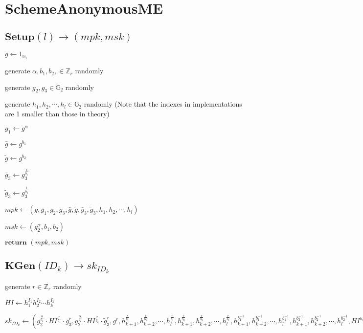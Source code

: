 \documentclass[a4paper]{article}
\begin{document}
\section{SchemeAnonymousME}

\subsection{$\textbf{Setup}(l) \rightarrow (\textit{mpk}, \textit{msk})$}

$g \gets 1_{\mathbb{G}_1}$

generate $\alpha, b_1, b_2, \in \mathbb{Z}_r$ randomly

generate $g_2, g_3 \in \mathbb{G}_2$ randomly

generate $h_1, h_2, \cdots, h_l \in \mathbb{G}_2$ randomly (Note that the indexes in implementations are 1 smaller than those in theory)

$g_1 \gets g^\alpha$

$\bar{g} \gets g^{b_1}$

$\tilde{g} \gets g^{b_2}$

$\bar{g}_3 \gets g_3^{\frac{1}{b_1}}$

$\tilde{g}_3 \gets g_3^{\frac{1}{b_2}}$

$\textit{mpk} \gets (g, g_1, g_2, g_3, \bar{g}, \tilde{g}, \bar{g}_3, \tilde{g}_3, h_1, h_2, \cdots, h_l)$

$\textit{msk} \gets (g_2^\alpha, b_1, b_2)$

$\textbf{return }(\textit{mpk}, \textit{msk})$

\subsection{$\textbf{KGen}(\textit{ID}_k) \rightarrow \textit{sk}_{\textit{ID}_k}$}

generate $r \in \mathbb{Z}_r$ randomly

$\textit{HI} \gets h_1^{I_1}h_2^{I_2}\cdots h_k^{I_k}$

$\textit{sk}_{\textit{ID}_k} \gets (
g_2^{\frac{\alpha}{b_1}} \cdot \textit{HI}^{\frac{r}{b_1}} \cdot \bar{g}_3^r, 
g_2^{\frac{\alpha}{b_2}} \cdot \textit{HI}^{\frac{r}{b_2}} \cdot \tilde{g}_3^r, 
g^r, 
h_{k + 1}^{\frac{r}{b_1}}, h_{k + 2}^{\frac{r}{b_1}}, \cdots, h_l^{\frac{r}{b_1}}, 
h_{k + 1}^{\frac{r}{b_2}}, h_{k + 2}^{\frac{r}{b_1}}, \cdots, h_l^{\frac{r}{b_1}}, 
h_{k + 1}^{b_1^{-1}}, h_{k + 2}^{b_1^{-1}}, \cdots, h_l^{b_1^{-1}}, 
h_{k + 1}^{b_2^{-1}}, h_{k + 2}^{b_2^{-1}}, \cdots, h_l^{b_2^{-1}}, 
\textit{HI}^{b_1^{-1}}, \textit{HI}^{b_2^{-1}}
)$
\end{document}
